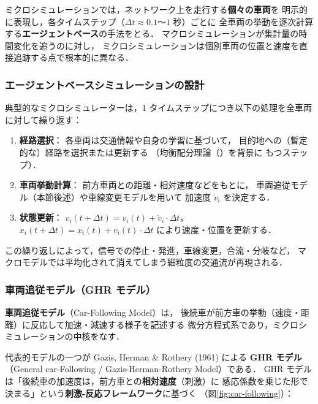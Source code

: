 ミクロシミュレーションでは，ネットワーク上を走行する\textbf{個々の車両}を
明示的に表現し，各タイムステップ（$\Delta t \approx 0.1$〜$1$ 秒）ごとに
全車両の挙動を逐次計算する\textbf{エージェントベース}の手法をとる．
マクロシミュレーションが集計量の時間変化を追うのに対し，
ミクロシミュレーションは個別車両の位置と速度を直接追跡する点で根本的に異なる．

\subsubsection*{エージェントベースシミュレーションの設計}

典型的なミクロシミュレーターは，1 タイムステップにつき以下の処理を全車両に対して繰り返す：

\begin{enumerate}
  \item \textbf{経路選択}：
    各車両は交通情報や自身の学習に基づいて，
    目的地への（暫定的な）経路を選択または更新する
    （均衡配分理論（）を背景に もつステップ）．
  \item \textbf{車両挙動計算}：
    前方車両との距離・相対速度などをもとに，
    車両追従モデル（本節後述）や車線変更モデルを用いて
    加速度 $\dot{v}_i$ を決定する．
  \item \textbf{状態更新}：
    $v_i(t+\Delta t) = v_i(t) + \dot{v}_i \cdot \Delta t$，
    $x_i(t+\Delta t) = x_i(t) + v_i(t)\cdot\Delta t$ により速度・位置を更新する．
\end{enumerate}

この繰り返しによって，信号での停止・発進，車線変更，合流・分岐など，
マクロモデルでは平均化されて消えてしまう細粒度の交通流が再現される．

\subsubsection*{車両追従モデル（GHR モデル）}

\textbf{車両追従モデル}（Car-Following Model）は，
後続車が前方車の挙動（速度・距離）に反応して加速・減速する様子を記述する
微分方程式系であり，ミクロシミュレーションの中核をなす．

代表的モデルの一つが Gazis, Herman \& Rothery (1961) による
\textbf{GHR モデル}（General car-Following / Gazis-Herman-Rothery Model）である\cite{Gazis1961}．
GHR モデルは「後続車の加速度は，前方車との\textbf{相対速度}（刺激）に
感応係数を乗じた形で決まる」という\textbf{刺激-反応フレームワーク}に基づく
（図\ref{fig:car-following}）：

